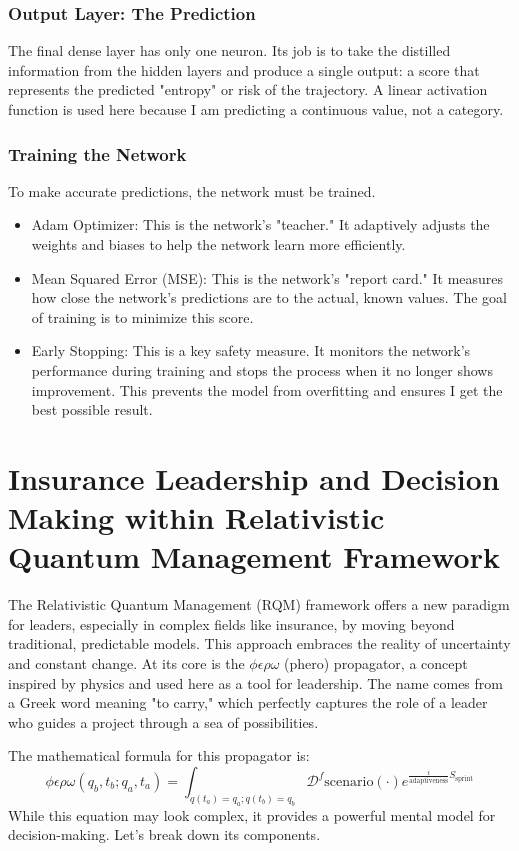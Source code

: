 \documentclass{article}
\begin{document}
\subsubsection*{Output Layer: The Prediction}
The final dense layer has only one neuron. Its job is to take the distilled information from the hidden layers and produce a single output: a score that represents the predicted "entropy" or risk of the trajectory. A linear activation function is used here because I am predicting a continuous value, not a category.

\subsubsection*{Training the Network}
To make accurate predictions, the network must be trained.
\begin{itemize}
\item Adam Optimizer: This is the network's "teacher." It adaptively adjusts the weights and biases to help the network learn more efficiently.
\item Mean Squared Error (MSE): This is the network's "report card." It measures how close the network's predictions are to the actual, known values. The goal of training is to minimize this score.
\item Early Stopping: This is a key safety measure. It monitors the network's performance during training and stops the process when it no longer shows improvement. This prevents the model from overfitting and ensures I get the best possible result.
\end{itemize}
\newpage
\section{Insurance Leadership and Decision Making within Relativistic Quantum Management Framework}
\label{sec3}
The Relativistic Quantum Management (RQM) framework offers a new paradigm for leaders, especially in complex fields like insurance, by moving beyond traditional, predictable models. This approach embraces the reality of uncertainty and constant change. At its core is the $\phi \epsilon \rho \omega$ (phero) propagator, a concept inspired by physics and used here as a tool for leadership. The name comes from a Greek word meaning "to carry," which perfectly captures the role of a leader who guides a project through a sea of possibilities.

The mathematical formula for this propagator is:
\begin{equation}
\phi\epsilon\rho\omega(q_b, t_b; q_a, t_a) = \int_{q(t_a)=q_a; q(t_b)=q_b} \mathcal{D}^f \text{scenario}(\cdot) e^{\frac{i}{\text{adaptiveness}} S_{\text{sprint}}}
\end{equation}
While this equation may look complex, it provides a powerful mental model for decision-making. Let's break down its components.
\end{document}
